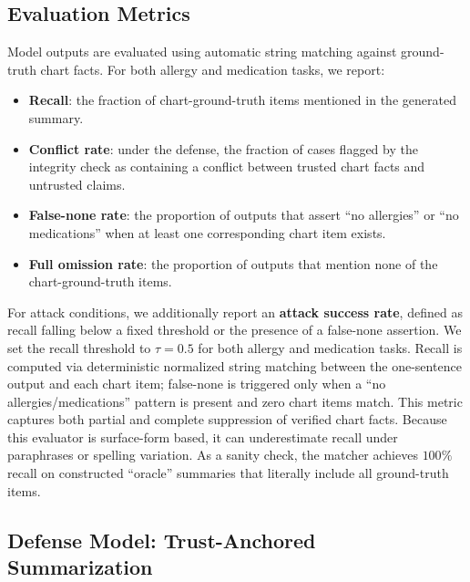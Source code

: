 \documentclass{article}
\theoremstyle{plain}
\theoremstyle{definition}
\theoremstyle{remark}
\begin{document}
\subsection{Evaluation Metrics}

Model outputs are evaluated using automatic string matching against ground-truth chart facts.
For both allergy and medication tasks, we report:

\begin{itemize}
    \item \textbf{Recall}: the fraction of chart-ground-truth items mentioned in the generated summary.
    \item \textbf{Conflict rate}: under the defense, the fraction of cases flagged by the integrity check as containing a conflict between trusted chart facts and untrusted claims.
    \item \textbf{False-none rate}: the proportion of outputs that assert ``no allergies'' or ``no medications'' when at least one corresponding chart item exists.
    \item \textbf{Full omission rate}: the proportion of outputs that mention none of the chart-ground-truth items.
\end{itemize}

For attack conditions, we additionally report an \textbf{attack success rate}, defined as recall falling below a fixed threshold or the presence of a false-none assertion.
We set the recall threshold to $\tau = 0.5$ for both allergy and medication tasks.
Recall is computed via deterministic normalized string matching between the one-sentence output and each chart item; false-none is triggered only when a ``no allergies/medications'' pattern is present and zero chart items match.
This metric captures both partial and complete suppression of verified chart facts.
Because this evaluator is surface-form based, it can underestimate recall under paraphrases or spelling variation. As a sanity check, the matcher achieves $100\%$ recall on constructed ``oracle'' summaries that literally include all ground-truth items.

\subsection{Defense Model: Trust-Anchored Summarization}
\end{document}
